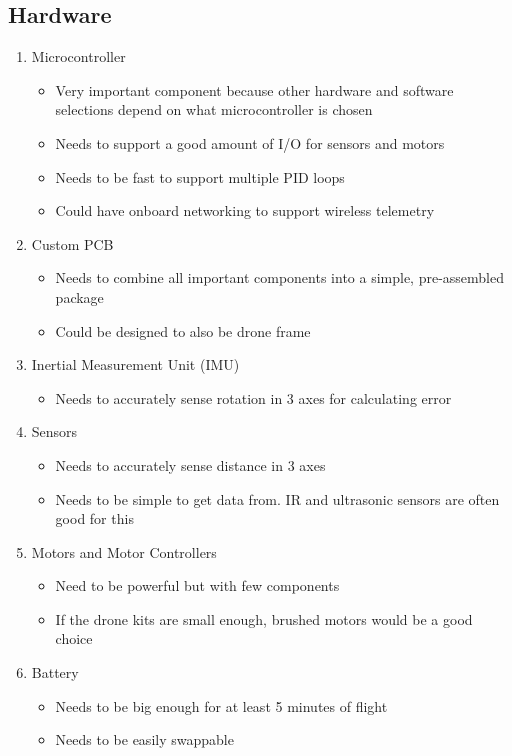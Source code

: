 \documentclass[12pt, titlepage]{article}
\begin{document}
\subsection{Hardware}
\begin{enumerate}

\item Microcontroller
\begin{itemize}
\item Very important component because other hardware and software selections depend on what microcontroller is chosen
\item Needs to support a good amount of I/O for sensors and motors
\item Needs to be fast to support multiple PID loops
\item Could have onboard networking to support wireless telemetry
\end{itemize}

\item Custom PCB
\begin{itemize}
\item Needs to combine all important components into a simple, pre-assembled package
\item Could be designed to also be drone frame
\end{itemize}

\item Inertial Measurement Unit (IMU)
\begin{itemize}
\item Needs to accurately sense rotation in 3 axes for calculating error
\end{itemize}

\item Sensors
\begin{itemize}
\item Needs to accurately sense distance in 3 axes
\item Needs to be simple to get data from. IR and ultrasonic sensors are often good for this
\end{itemize}

\item Motors and Motor Controllers
\begin{itemize}
\item Need to be powerful but with few components
\item If the drone kits are small enough, brushed motors would be a good choice
\end{itemize}

\item Battery
\begin{itemize}
\item Needs to be big enough for at least 5 minutes of flight
\item Needs to be easily swappable
\end{itemize}


\end{enumerate}
\end{document}
